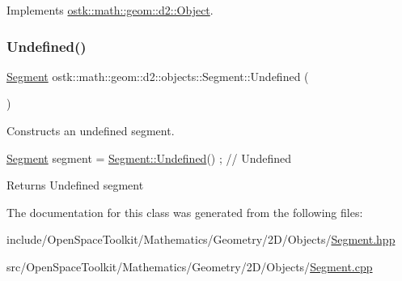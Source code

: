 Implements \hyperlink{classostk_1_1math_1_1geom_1_1d2_1_1_object_ada4c2187dd24ef02b91b6346191f677c}{ostk\+::math\+::geom\+::d2\+::\+Object}.

\mbox{\label{classostk_1_1math_1_1geom_1_1d2_1_1objects_1_1_segment_a44d3a5817296d96bf82ebbc459055025}} 
\subsubsection{\texorpdfstring{Undefined()}{Undefined()}}
{\footnotesize\ttfamily \hyperlink{classostk_1_1math_1_1geom_1_1d2_1_1objects_1_1_segment}{Segment} ostk\+::math\+::geom\+::d2\+::objects\+::\+Segment\+::\+Undefined (\begin{DoxyParamCaption}{ }\end{DoxyParamCaption})\hspace{0.3cm}{\ttfamily [static]}}



Constructs an undefined segment. 


\begin{DoxyCode}
\hyperlink{classostk_1_1math_1_1geom_1_1d2_1_1objects_1_1_segment_a56c91f22315d7cefe9d5e9973330028d}{Segment} segment = \hyperlink{classostk_1_1math_1_1geom_1_1d2_1_1objects_1_1_segment_a44d3a5817296d96bf82ebbc459055025}{Segment::Undefined}() ; \textcolor{comment}{// Undefined}
\end{DoxyCode}


\begin{DoxyReturn}{Returns}
Undefined segment 
\end{DoxyReturn}


The documentation for this class was generated from the following files\+:\begin{DoxyCompactItemize}
\item 
include/\+Open\+Space\+Toolkit/\+Mathematics/\+Geometry/2\+D/\+Objects/\hyperlink{2_d_2_objects_2_segment_8hpp}{Segment.\+hpp}\item 
src/\+Open\+Space\+Toolkit/\+Mathematics/\+Geometry/2\+D/\+Objects/\hyperlink{2_d_2_objects_2_segment_8cpp}{Segment.\+cpp}\end{DoxyCompactItemize}
